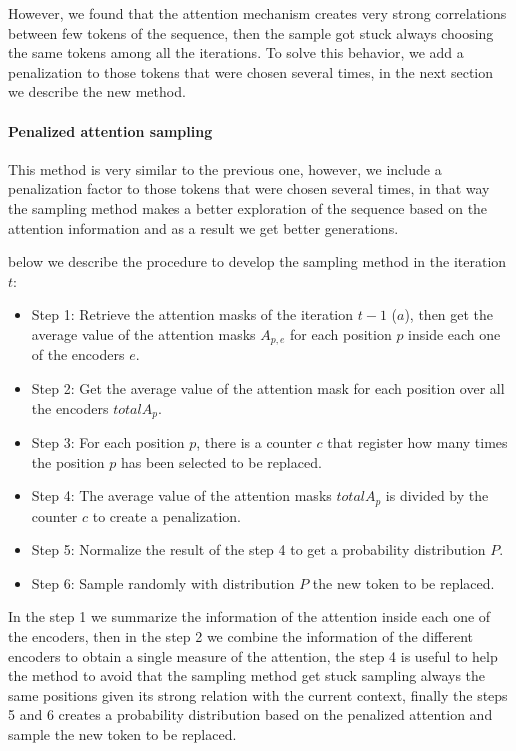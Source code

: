 \documentclass[10pt,twocolumn,letterpaper]{article}
\begin{document}
However, we found that the attention mechanism creates very strong correlations between
few tokens of the sequence, then the sample got stuck always choosing the same tokens among
all the iterations.
To solve this behavior, we add a penalization to those tokens that were
chosen several times, in the next section we describe the new method.

\paragraph{Penalized attention sampling}
This method is very similar to the previous one, however, we include a penalization factor
to those tokens that were chosen several times, in that way the sampling method makes a better
exploration of the sequence based on the attention information and as a result we get better
generations.

below we describe the procedure to develop the sampling method in the iteration $t$:

\begin{itemize}
\item Step 1: Retrieve the attention masks of the iteration $t-1$ ($a$), then get the average value of the attention masks $A_{p,e}$ for each position $p$ inside each one of the encoders $e$.
\item Step 2: Get the average value of the attention mask for each position over all the encoders $totalA_{p}$.
\item Step 3: For each position $p$, there is a counter $c$ that register how many times the position $p$ has been selected to be replaced.
\item Step 4: The average value of the attention masks $totalA_{p}$ is divided by the counter $c$ to create a penalization.
\item Step 5: Normalize the result of the step 4 to get a probability distribution $P$.
\item Step 6: Sample randomly with distribution $P$ the new token to be replaced.
\end{itemize}

In the step 1 we summarize the information of the attention inside each one of the encoders,
then in the step 2 we combine the information of the different encoders to obtain a single
measure of the attention, the step 4 is useful to help the method to avoid that the sampling
method get stuck sampling always the same positions given its strong relation with the current
context, finally the steps 5 and 6 creates a probability distribution based on the penalized attention
and sample the new token to be replaced.
\end{document}
